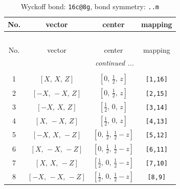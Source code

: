\documentclass[fleqn,8pt]{jsarticle}
\begin{document}
\renewcommand{\arraystretch}{1.2}
\begin{longtable}{cccc}
\caption{Wyckoff bond: {\tt 16c@8g}, bond symmetry: {\tt ..m}}
 \\
 \hline \hline
No. & vector & center & mapping \\ \hline \endfirsthead

\multicolumn{3}{l}{\tablename\ \thetable{}} \\
 \hline \hline
No. & vector & center & mapping \\ \hline \endhead

 \hline \hline
\multicolumn{3}{r}{\footnotesize\it continued ...} \\ \endfoot

 \hline \hline
\multicolumn{3}{r}{} \\ \endlastfoot

1 & $\left[ X,\, X,\, Z \right]$ & $\left[ 0,\, \frac{1}{2},\, z \right]$ & {\tt [1,16]} \\ \hline
2 & $\left[ - X,\, - X,\, Z \right]$ & $\left[ 0,\, \frac{1}{2},\, z \right]$ & {\tt [2,15]} \\ \hline
3 & $\left[ - X,\, X,\, Z \right]$ & $\left[ \frac{1}{2},\, 0,\, z \right]$ & {\tt [3,14]} \\ \hline
4 & $\left[ X,\, - X,\, Z \right]$ & $\left[ \frac{1}{2},\, 0,\, z \right]$ & {\tt [4,13]} \\ \hline
5 & $\left[ - X,\, X,\, - Z \right]$ & $\left[ 0,\, \frac{1}{2},\, \frac{1}{2} - z \right]$ & {\tt [5,12]} \\ \hline
6 & $\left[ X,\, - X,\, - Z \right]$ & $\left[ 0,\, \frac{1}{2},\, \frac{1}{2} - z \right]$ & {\tt [6,11]} \\ \hline
7 & $\left[ X,\, X,\, - Z \right]$ & $\left[ \frac{1}{2},\, 0,\, \frac{1}{2} - z \right]$ & {\tt [7,10]} \\ \hline
8 & $\left[ - X,\, - X,\, - Z \right]$ & $\left[ \frac{1}{2},\, 0,\, \frac{1}{2} - z \right]$ & {\tt [8,9]} \\
\end{longtable}
\renewcommand{\arraystretch}{1.2}
\end{document}
